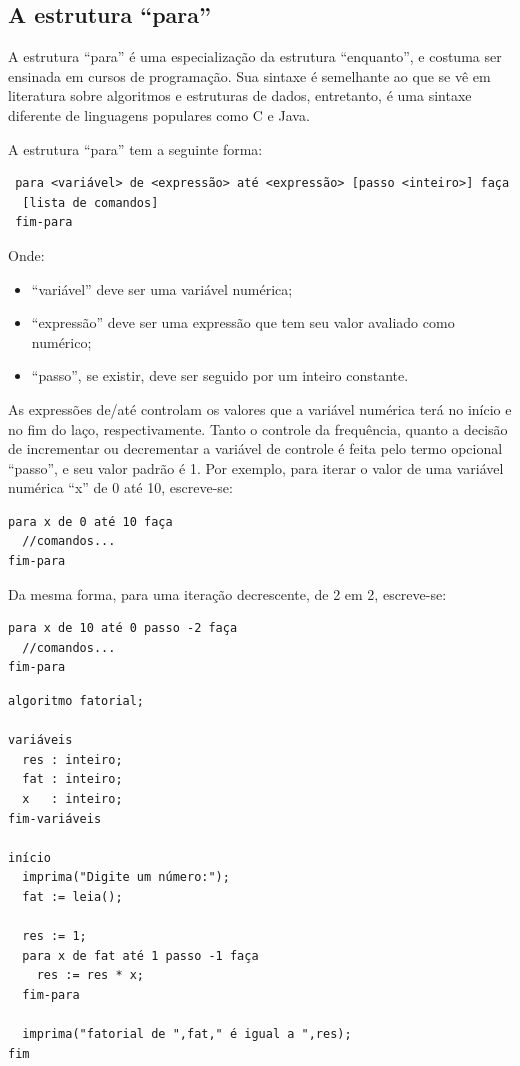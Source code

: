 \documentclass[a4paper,11pt]{report}
\begin{document}
\subsection{A estrutura ``para''}

A estrutura ``para'' é uma especialização da estrutura ``enquanto'', e costuma
ser ensinada em cursos de programação. Sua sintaxe é semelhante ao que se vê em
literatura sobre algoritmos e estruturas de dados, entretanto, é uma sintaxe
diferente de linguagens populares como C e Java.

A estrutura ``para'' tem a seguinte forma:

\begin{verbatim}
 para <variável> de <expressão> até <expressão> [passo <inteiro>] faça
  [lista de comandos]
 fim-para
\end{verbatim}

Onde:
\begin{itemize}
  \item ``variável'' deve ser uma variável numérica;
  \item ``expressão'' deve ser uma expressão que tem seu valor avaliado como
    numérico;
  \item ``passo'', se existir, deve ser seguido por um inteiro constante.
\end{itemize}

As expressões de/até controlam os valores que a variável numérica terá no início
e no fim do laço, respectivamente. Tanto o controle da frequência, quanto a
decisão de incrementar ou decrementar a variável de controle é feita pelo termo
opcional ``passo'', e seu valor padrão é 1. Por exemplo, para iterar o valor de
uma variável numérica ``x'' de 0 até 10, escreve-se:

  \begin{verbatim}
para x de 0 até 10 faça
  //comandos...
fim-para
  \end{verbatim}

Da mesma forma, para uma iteração decrescente, de 2 em 2, escreve-se:

  \begin{verbatim}
para x de 10 até 0 passo -2 faça
  //comandos...
fim-para
  \end{verbatim}

\begin{program}
  \begin{verbatim}
algoritmo fatorial;

variáveis
  res : inteiro;
  fat : inteiro;
  x   : inteiro;
fim-variáveis

início
  imprima("Digite um número:");
  fat := leia();

  res := 1;
  para x de fat até 1 passo -1 faça
    res := res * x;
  fim-para

  imprima("fatorial de ",fat," é igual a ",res);
fim

  \end{verbatim}
  \caption{Exemplo de programa que utiliza a estrutura ``para''.}
\end{program}
\end{document}
